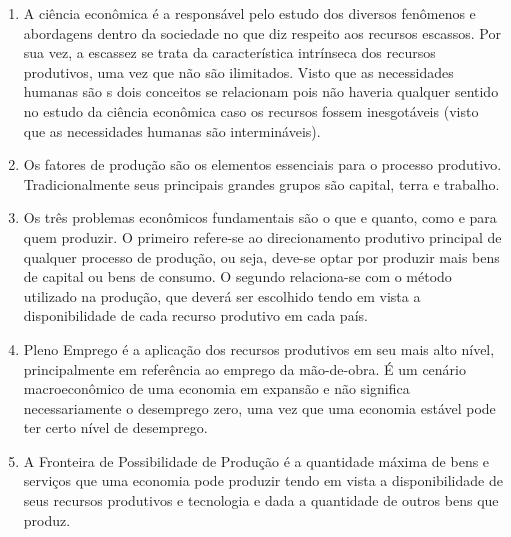 \documentclass[a4paper, 12pt]{article}
\begin{document}
\begin{enumerate}
	\item A ciência econômica é a responsável pelo estudo dos diversos fenômenos e abordagens dentro da sociedade no que diz respeito aos recursos escassos. Por sua vez, a escassez se trata da característica intrínseca dos recursos produtivos, uma vez que não são ilimitados. Visto que as necessidades humanas são s dois conceitos se relacionam pois não haveria qualquer sentido no estudo da ciência econômica caso os recursos fossem inesgotáveis (visto que as necessidades humanas são intermináveis).
	\\

	\item Os fatores de produção são os elementos essenciais para o processo produtivo. Tradicionalmente seus principais grandes grupos são capital, terra e trabalho.
	\\

	\item Os três problemas econômicos fundamentais são o que e quanto, como e para quem produzir. O primeiro refere-se ao direcionamento produtivo principal de qualquer processo de produção, ou seja, deve-se optar por produzir mais bens de capital ou bens de consumo. O segundo relaciona-se com o método utilizado na produção, que deverá ser escolhido tendo em vista a disponibilidade de cada recurso produtivo em cada país.
	\\

	\item Pleno Emprego é a aplicação dos recursos produtivos em seu mais alto nível, principalmente em referência ao emprego da mão-de-obra. É um cenário macroeconômico de uma economia em expansão e não significa necessariamente o desemprego zero, uma vez que uma economia estável pode ter certo nível de desemprego.
	\\

	\item A Fronteira de Possibilidade de Produção é a quantidade máxima de bens e serviços que uma economia pode produzir tendo em vista a disponibilidade de seus recursos produtivos e tecnologia e dada a quantidade de outros bens que produz.\\
		\begin{tikzpicture}[scale=0.5, axis/.style={very thick, ->, >=stealth'}, important line/.style={thick}, dashed line/.style={dashed, thin}, pile/.style={thick, ->, >=stealth', shorten <=2pt, shorten >=2pt}, every node/.style={color=black}]


\end{tikzpicture}
\end{enumerate}
\end{document}
